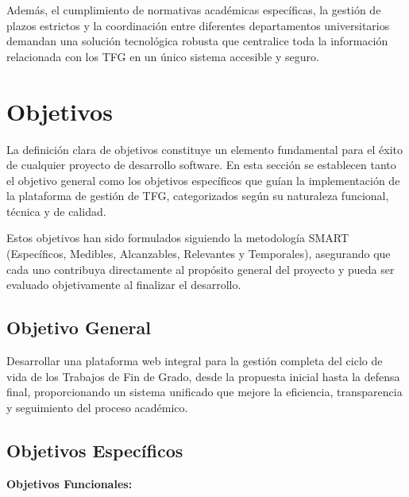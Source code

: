 \documentclass[12pt,a4paper,oneside]{report}
\begin{document}
Además, el cumplimiento de normativas académicas específicas, la gestión
de plazos estrictos y la coordinación entre diferentes departamentos
universitarios demandan una solución tecnológica robusta que centralice
toda la información relacionada con los TFG en un único sistema
accesible y seguro.

\section{Objetivos}\label{objetivos}

La definición clara de objetivos constituye un elemento fundamental para
el éxito de cualquier proyecto de desarrollo software. En esta sección
se establecen tanto el objetivo general como los objetivos específicos
que guían la implementación de la plataforma de gestión de TFG,
categorizados según su naturaleza funcional, técnica y de calidad.

Estos objetivos han sido formulados siguiendo la metodología SMART
(Específicos, Medibles, Alcanzables, Relevantes y Temporales),
asegurando que cada uno contribuya directamente al propósito general del
proyecto y pueda ser evaluado objetivamente al finalizar el desarrollo.

\subsection{Objetivo General}\label{objetivo-general}

Desarrollar una plataforma web integral para la gestión completa del
ciclo de vida de los Trabajos de Fin de Grado, desde la propuesta
inicial hasta la defensa final, proporcionando un sistema unificado que
mejore la eficiencia, transparencia y seguimiento del proceso académico.

\subsection{Objetivos Específicos}\label{objetivos-especuxedficos}

\textbf{Objetivos Funcionales:}
\end{document}
